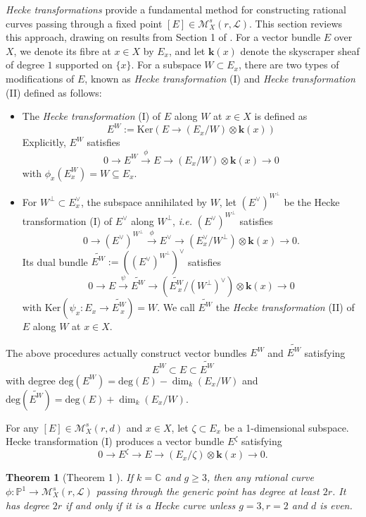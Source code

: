 \documentclass[10pt,a4paper]{amsart}
\newtheorem{theorem}{Theorem}
\begin{document}
\emph{Hecke transformations} provide a fundamental method for constructing rational curves passing through a fixed point $[E]\in\mathcal{M}^s_X(r,\mathcal{L})$. This section reviews this approach, drawing on results from Section 1 of \cite{Sun05}.
For a vector bundle $E$ over $X$, we denote its fibre at $x\in X$ by $E_x$, and let $\textbf{k}(x)$ denote the skyscraper sheaf of degree $1$ supported on $\{x\}$. For a subspace $W\subset E_x$, there are two types of modifications of $E$, known as \emph{Hecke transformation} (I) and \emph{Hecke transformation} (II) defined as follows:
\begin{itemize}
    \item [(I)] The \emph{Hecke transformation} (I) of $E$ along $W$ at $x \in X$ is defined as $$E^W:=\mathrm{Ker}(E\to (E_x/W)\otimes\textbf{k}(x))$$
    Explicitly, $E^W$ satisfies
    $$0\to E^W \xrightarrow{\phi} E \to (E_x/W)\otimes\textbf{k}(x)\to 0$$
    with $\phi_x(E^W_x)=W \subseteq E_x$.
    \newline
    \item[(II)] For $W^{\bot} \subset E_x^{\vee}$, the subspace annihilated by $W$, let $(E^{\vee})^{W^{\bot}}$ be the Hecke transformation (I) of  $E^\vee$ along $W^{\bot}$, \emph{i.e.} $(E^{\vee})^{W^{\bot}}$ satisfies 
    $$0\to(E^{\vee})^{W^{\bot}} \xrightarrow{\phi} E^{\vee} \to (E_x^{\vee}/W^{\bot})\otimes\textbf{k}(x)\to 0.$$
    Its dual bundle $\widetilde{E^W}:=((E^{\vee})^{W^{\bot}})^{\vee}$ satisfies 
    $$0 \to E \xrightarrow{\psi} \widetilde{E^W} \to (\widetilde{E_{\ x}^W}/(W^{\bot})^{\vee})\otimes \textbf{k}(x) \to 0$$
    with $\mathrm{Ker}(\psi_x: E_x \to \widetilde{E_{\ x}^W})=W$. We call $\widetilde{E^W}$ the  \emph{Hecke transformation} (II) of $E$ along $W$ at $x \in X$.
\end{itemize}
The above procedures actually construct vector bundles $E^W$ and $\widetilde{E^W}$ satisfying
$$E^W \subset E \subset \widetilde{E^W}$$ with degree $\mathrm{deg}(E^W)=\mathrm{deg}(E)-\dim_k(E_x/W)$ and $\mathrm{deg}(\widetilde{E^W})= \mathrm{deg}(E)+\dim_k(E_x/W)$.

For any $[E]\in\mathcal{M}^s_X(r,d)$ and $x \in X$, let $\zeta \subset E_x$ be a 1-dimensional subspace. Hecke transformation (I) produces a vector bundle $E^{\zeta}$ satisfying 
\begin{equation*}
    0 \to E^{\zeta} \to E \to (E_x/\zeta)\otimes \textbf{k}(x) \to 0.
\end{equation*}

\begin{theorem}[Theorem 1 \cite{Sun05}]
If $k=\mathbb{C}$ and $g \geq 3$, then any rational curve $\phi: \mathbb{P}^1 \to \mathcal{M}^s_X(r,\mathcal{L})$ passing through the generic point has degree at least $2r$. It has degree $2r$ if and only if it is a Hecke curve unless $g=3, r=2$ and $d$ is even.
\end{theorem}
\end{document}
